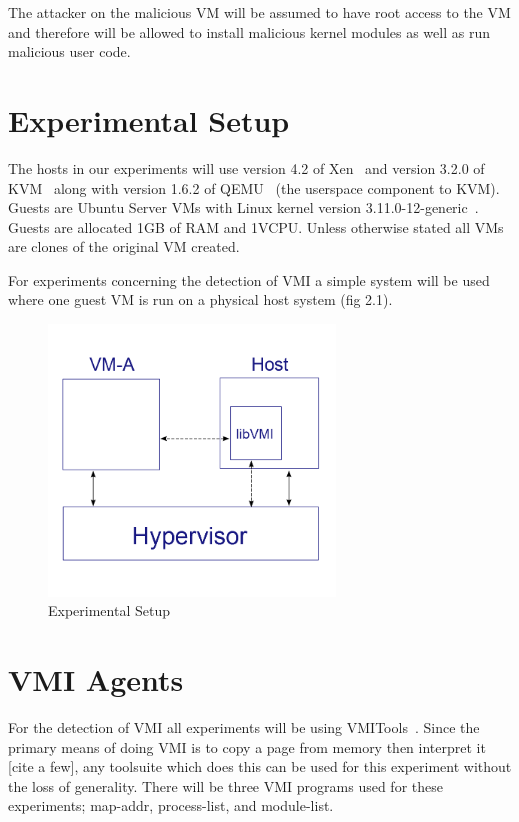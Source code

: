 	The attacker on the malicious VM will be assumed to have root access to the VM and therefore will be allowed to install malicious kernel modules as well as run malicious user code. 

\section{Experimental Setup}

	The hosts in our experiments will use version 4.2 of Xen~\cite{barham_xen_2003} and version 3.2.0 of KVM ~\cite{kivity_kvm:_2007}along with version 1.6.2 of QEMU~\cite{bellard_qemu_2005} (the userspace component to KVM). Guests are Ubuntu Server VMs with Linux kernel version 3.11.0-12-generic~\cite{_Linux_archive}. Guests are allocated 1GB of RAM and 1VCPU. Unless otherwise stated all VMs are clones of the original VM created. 

	For experiments concerning the detection of VMI a simple system will be used where one guest VM is run on a physical host system (fig 2.1). 

	\begin{figure}\label{ExpApp}
	  \centering
	  \includegraphics[width=3in]{figures/BM_graph3_cropped.png}
	  \caption{Experimental Setup}
	\end{figure}

\section{VMI Agents}
For the detection of VMI all experiments will be using VMITools~\cite{payne_vmitools_2014}. Since the primary means of doing VMI is to copy a page from memory then interpret it [cite a few], any toolsuite which does this can be used for this experiment without the loss of generality. There will be three VMI programs used for these experiments; map-addr, process-list, and module-list. 


